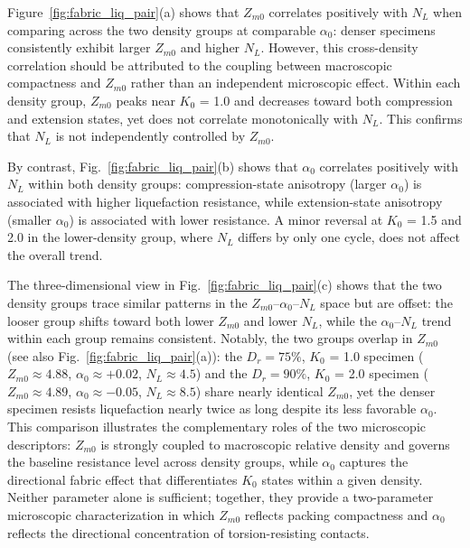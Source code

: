 \documentclass[a4paper,fleqn]{cas-sc}
\newcommand{\Kzero}{\ensuremath{K_0}}
\begin{document}
Figure~\ref{fig:fabric_liq_pair}(a) shows that $Z_{m0}$ correlates positively with $N_L$ when comparing across the two density groups at comparable $\alpha_0$: denser specimens consistently exhibit larger $Z_{m0}$ and higher $N_L$. However, this cross-density correlation should be attributed to the coupling between macroscopic compactness and $Z_{m0}$ rather than an independent microscopic effect. Within each density group, $Z_{m0}$ peaks near \Kzero{} = 1.0 and decreases toward both compression and extension states, yet does not correlate monotonically with $N_L$. This confirms that $N_L$ is not independently controlled by $Z_{m0}$.

By contrast, Fig.~\ref{fig:fabric_liq_pair}(b) shows that $\alpha_0$ correlates positively with $N_L$ within both density groups: compression-state anisotropy (larger $\alpha_0$) is associated with higher liquefaction resistance, while extension-state anisotropy (smaller $\alpha_0$) is associated with lower resistance. A minor reversal at \Kzero{} = 1.5 and 2.0 in the lower-density group, where $N_L$ differs by only one cycle, does not affect the overall trend.

The three-dimensional view in Fig.~\ref{fig:fabric_liq_pair}(c) shows that the two density groups trace similar patterns in the $Z_{m0}$--$\alpha_0$--$N_L$ space but are offset: the looser group shifts toward both lower $Z_{m0}$ and lower $N_L$, while the $\alpha_0$--$N_L$ trend within each group remains consistent. Notably, the two groups overlap in $Z_{m0}$ (see also Fig.~\ref{fig:fabric_liq_pair}(a)): the $D_r = 75\%$, \Kzero{} = 1.0 specimen ($Z_{m0} \approx 4.88$, $\alpha_0 \approx +0.02$, $N_L \approx 4.5$) and the $D_r = 90\%$, \Kzero{} = 2.0 specimen ($Z_{m0} \approx 4.89$, $\alpha_0 \approx -0.05$, $N_L \approx 8.5$) share nearly identical $Z_{m0}$, yet the denser specimen resists liquefaction nearly twice as long despite its less favorable $\alpha_0$. This comparison illustrates the complementary roles of the two microscopic descriptors: $Z_{m0}$ is strongly coupled to macroscopic relative density and governs the baseline resistance level across density groups, while $\alpha_0$ captures the directional fabric effect that differentiates \Kzero{} states within a given density. Neither parameter alone is sufficient; together, they provide a two-parameter microscopic characterization in which $Z_{m0}$ reflects packing compactness and $\alpha_0$ reflects the directional concentration of torsion-resisting contacts.
\end{document}
